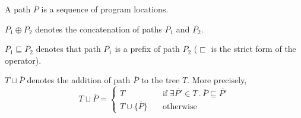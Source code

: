 \newcommand{\true}{\ensuremath{\mathrm{true}}}
\newcommand{\pc}{\ensuremath{\mathit{pc}}}
\newcommand{\hlhlt}[1]{\textcolor{blue}{#1}}
\newcommand{\concat}{\ensuremath{\oplus}}

A path $\overline{P}$ is a sequence of program locations.

$\overline{P_1} \concat \overline{P_2}$ denotes the concatenation of paths $\overline{P_1}$ and $\overline{P_2}$.

$\overline{P_1} \sqsubseteq \overline{P_2}$ denotes that path $\overline{P_1}$ is a prefix of path $\overline{P_2}$ ($\sqsubset$ is the strict form of the operator).

$T \sqcup \overline{P}$ denotes the addition of path $\overline{P}$ to the tree $T$.  More precisely,
\[
T \sqcup \overline{P} = \begin{cases}
  T & \quad \mathrm{if} \; \exists \overline{P'} \in T \,.\, \overline{P} \sqsubseteq \overline{P'} \\
  T \cup \{ \overline{P} \} & \quad \mathrm{otherwise}
                        \end{cases}
\]



